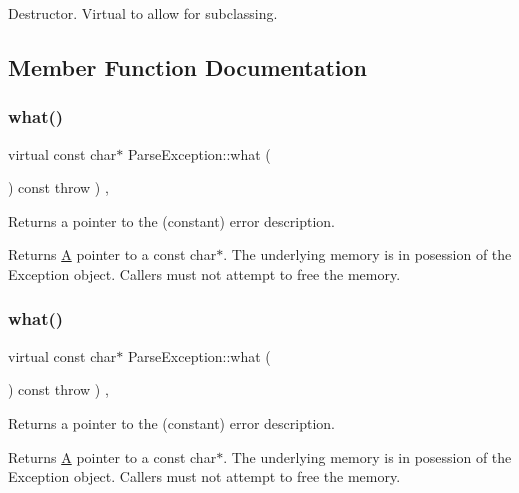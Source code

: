 Destructor. Virtual to allow for subclassing. 

\subsection{Member Function Documentation}
\mbox{\label{classParseException_a7c96d5c467fe71354528570caf9209cd}} 
\subsubsection{\texorpdfstring{what()}{what()}\hspace{0.1cm}{\footnotesize\ttfamily [1/3]}}
{\footnotesize\ttfamily virtual const char$\ast$ Parse\+Exception\+::what (\begin{DoxyParamCaption}{ }\end{DoxyParamCaption}) const throw  ) \hspace{0.3cm}{\ttfamily [inline]}, {\ttfamily [virtual]}}

Returns a pointer to the (constant) error description. \begin{DoxyReturn}{Returns}
\hyperlink{classA}{A} pointer to a const char$\ast$. The underlying memory is in posession of the Exception object. Callers must not attempt to free the memory. 
\end{DoxyReturn}
\mbox{\label{classParseException_a7c96d5c467fe71354528570caf9209cd}} 
\subsubsection{\texorpdfstring{what()}{what()}\hspace{0.1cm}{\footnotesize\ttfamily [2/3]}}
{\footnotesize\ttfamily virtual const char$\ast$ Parse\+Exception\+::what (\begin{DoxyParamCaption}{ }\end{DoxyParamCaption}) const throw  ) \hspace{0.3cm}{\ttfamily [inline]}, {\ttfamily [virtual]}}

Returns a pointer to the (constant) error description. \begin{DoxyReturn}{Returns}
\hyperlink{classA}{A} pointer to a const char$\ast$. The underlying memory is in posession of the Exception object. Callers must not attempt to free the memory. 
\end{DoxyReturn}
\mbox{\label{classParseException_a7c96d5c467fe71354528570caf9209cd}} 
